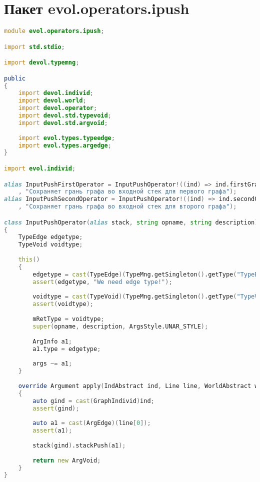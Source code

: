 \documentclass[russian,utf8,emptystyle]{eskdtext}
\begin{document}
\section{Пакет evol.operators.ipush}
\begin{lstlisting}[language=D]
module evol.operators.ipush;

import std.stdio;

import devol.typemng;

public
{
    import devol.individ;
    import devol.world;
    import devol.operator;
    import devol.std.typevoid;
    import devol.std.argvoid;
    
    import evol.types.typeedge;
    import evol.types.argedge;
}

import evol.individ;

alias InputPushFirstOperator = InputPushOperator!((ind) => ind.firstGraphStack, "ipush1"
    , "Сохраняет грань графа во входной стек для первого графа");  
alias InputPushSecondOperator = InputPushOperator!((ind) => ind.secondGraphStack, "ipush2"
    , "Сохраняет грань графа во входной стек для второго графа");

class InputPushOperator(alias stack, string opname, string description) : Operator
{
    TypeEdge edgetype;
    TypeVoid voidtype;
    
    this()
    {
        edgetype = cast(TypeEdge)(TypeMng.getSingleton().getType("TypeEdge"));
        assert(edgetype, "We need edge type!");
    
        voidtype = cast(TypeVoid)(TypeMng.getSingleton().getType("TypeVoid"));
        assert(voidtype);
        
        mRetType = voidtype;
        super(opname, description, ArgsStyle.UNAR_STYLE);
        
        ArgInfo a1;
        a1.type = edgetype;
        
        args ~= a1;
    }
    
    override Argument apply(IndAbstract ind, Line line, WorldAbstract world)
    {
        auto gind = cast(GraphIndivid)ind;
        assert(gind);
        
        auto a1 = cast(ArgEdge)(line[0]);
        assert(a1);
        
        stack(gind).stackPush(a1);
        
        return new ArgVoid;
    }   
}
\end{lstlisting}
\end{document}
